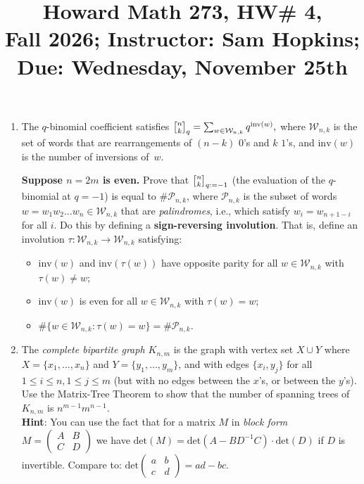 \documentclass[11pt]{article}
\title{Howard Math 273, HW\# 4, \\ {\normalsize Fall 2026; Instructor: Sam Hopkins; Due: Wednesday, November 25th}}
\date{}
\begin{document}
\maketitle

\thispagestyle{empty}

\vspace{-1cm}

\begin{enumerate}

\renewcommand{\binom}{\genfrac{(}{)}{0pt}{}}
\DeclareRobustCommand{\qbinom}{\genfrac{\lbrack}{\rbrack}{0pt}{}}

\item The $q$-binomial coefficient satisfies $\qbinom{n}{k}_q = \sum_{w \in \mathcal{W}_{n,k}} q^{\mathrm{inv}(w)},$ where $\mathcal{W}_{n,k}$ is the set of words that are rearrangements of $(n-k)$ $0$'s and $k$ $1$'s, and $\mathrm{inv}(w)$ is the number of inversions of~$w$.

{\bf Suppose $n=2m$ is even.} Prove that $\qbinom{n}{k}_{q := -1}$ (the evaluation of the $q$-binomial at $q=-1$) is equal to $\#\mathcal{P}_{n,k}$, where $\mathcal{P}_{n,k}$ is the subset of words $w=w_1w_2\ldots w_{n} \in \mathcal{W}_{n,k}$ that are \emph{palindromes}, i.e., which satisfy $w_i = w_{n+1-i}$ for all $i$. Do this by defining a {\bf sign-reversing involution}. That is, define an involution $\tau\colon \mathcal{W}_{n,k}\to \mathcal{W}_{n,k}$ satisfying:
\begin{itemize}
\item $\mathrm{inv}(w)$ and $\mathrm{inv}(\tau(w))$ have opposite parity for all $w\in \mathcal{W}_{n,k}$ with $\tau(w)\neq w$;
\item $\mathrm{inv}(w)$ is even for all $w\in \mathcal{W}_{n,k}$ with $\tau(w)=w$;
\item $\#\{w\in \mathcal{W}_{n,k}\colon \tau(w)=w\} = \#\mathcal{P}_{n,k}$.
\end{itemize}

\item The \emph{complete bipartite graph $K_{n,m}$} is the graph with vertex set $X\cup Y$ where $X=\{x_1,...,x_n\}$ and $Y=\{y_1,...,y_m\}$, and with edges $\{x_i,y_j\}$ for all $1\leq i \leq n, 1\leq j \leq m$ (but with no edges between the $x$'s, or between the $y$'s). Use the Matrix-Tree Theorem to show that the number of spanning trees of $K_{n,m}$ is $n^{m-1}m^{n-1}$. \\
{\bf Hint}: You can use the fact that for a matrix $M$ in \emph{block form} $M=\begin{pmatrix} A & B \\ C & D \end{pmatrix}$ we have $\mathrm{det}(M) = \mathrm{det}(A-BD^{-1}C)\cdot\mathrm{det}(D)$ if $D$ is invertible. Compare to: $\mathrm{det}\begin{pmatrix} a & b \\ c & d\end{pmatrix}=ad-bc$.


\end{enumerate}
\end{document}
